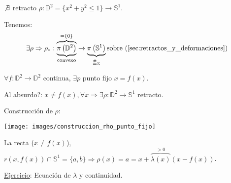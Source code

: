 \begin{theo}[de no retracto]
$\not \exists $ retracto $\rho: \mathbb{D}^2 = \{x^2 + y^2 \le 1\} \rightarrow \mathbb{S}^{1}$. 
\end{theo}
\begin{demo}
    Tenemos:
    \[
    \exists \rho \Rightarrow \rho_*: \overbrace{\underbrace{\pi\left( \mathbb{D}^2 \right) }_{\text{convexo}}}^{= \{0\}} \rightarrow \underbrace{\pi\left( \mathbb{S}^{1} \right)}_{\stackrel{\#}{=} \mathbb{Z}} \text{sobre (\ref{sec:retractos_y_deformaciones})
}   \]
\end{demo}

\begin{theo}
$\forall f: \mathbb{D}^2 \rightarrow \mathbb{D}^2$ continua, $\exists p$ punto fijo $x = f\left( x\right)$.
\end{theo}
\begin{demo}
Al absurdo?: $x \neq f\left( x \right), \forall x \Rightarrow \exists \rho: \mathbb{D}^2 \rightarrow \mathbb{S}^{1}$ retracto.

Construcción de $\rho$:
\begin{center}
    \texttt{[image: images/construccion\_rho\_punto\_fijo]} 
\end{center}
La recta ($x \neq f\left( x \right)$), $r\left( x, f\left( x \right) \right) \cap \mathbb{S}^{1} = \{a, b\} \Rightarrow \rho\left( x \right) = a = x + \overbrace{\lambda \left( x \right)}^{> 0} \left( x - f\left( x \right) \right)$. 

\underline{Ejercicio}: Ecuación de $\lambda$ y continuidad.
\end{demo}

